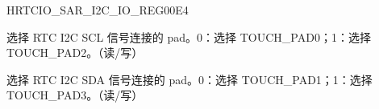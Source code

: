 \begin{register}{H}{RTCIO\_SAR\_I2C\_IO\_REG}{\hexprefix{}00E4}\label{regdesc:RTCIOSARI2CIOREG}
%
%
%
\regnewline%
\begin{regdesc}\begin{reglist}
\label{fielddesc:RTCIOSARI2CSCLSEL}\item [RTCIO\_SAR\_I2C\_SCL\_SEL]选择 RTC I2C SCL 信号连接的 pad。0：选择 TOUCH\_PAD0；1：选择 TOUCH\_PAD2。（读/写）
\label{fielddesc:RTCIOSARI2CSDASEL}\item [RTCIO\_SAR\_I2C\_SDA\_SEL]选择 RTC I2C SDA 信号连接的 pad。0：选择 TOUCH\_PAD1；1：选择 TOUCH\_PAD3。（读/写）
\end{reglist}\end{regdesc}
\end{register}


